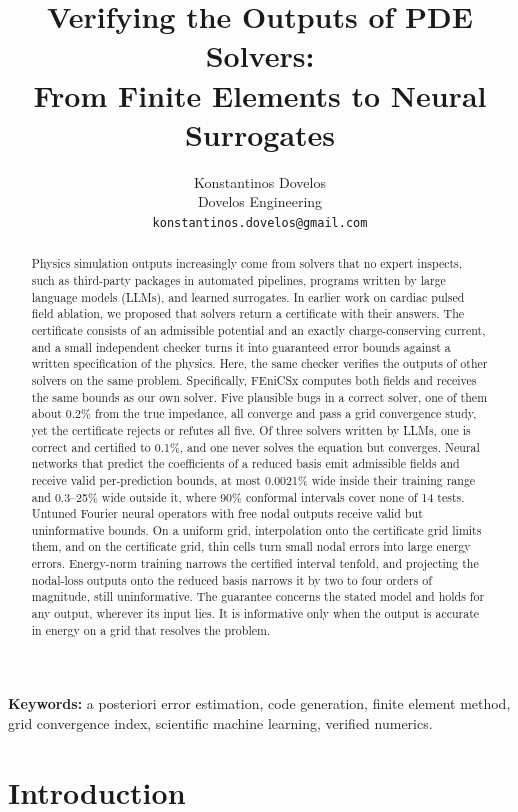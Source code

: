 \documentclass[11pt]{article}
\title{Verifying the Outputs of PDE Solvers:\\
From Finite Elements to Neural Surrogates}
\author{Konstantinos Dovelos\\ \small Dovelos Engineering \\ \small \texttt{konstantinos.dovelos@gmail.com}}
\date{}
\begin{document}
\maketitle

\begin{abstract}
Physics simulation outputs increasingly come from solvers that no expert inspects,
such as third-party packages in automated pipelines, programs written by large
language models (LLMs), and learned surrogates. In earlier work on cardiac pulsed field ablation,
we proposed that solvers return a certificate with their answers. The certificate
consists of an admissible potential and an exactly charge-conserving current, and a small
independent checker turns it into guaranteed error bounds against a written
specification of the physics. Here, the same checker verifies the outputs of other
solvers on the same problem. Specifically, FEniCSx
computes both fields and receives the same bounds as our own solver. Five plausible
bugs in a correct solver, one of them about 0.2\% from the true impedance, all
converge and pass a grid convergence study, yet the certificate
rejects or refutes all five. Of three solvers written by LLMs, one is correct and
certified to 0.1\%, and one never solves the equation but converges. Neural
networks that predict the coefficients of a reduced basis emit admissible fields and
receive valid per-prediction bounds, at most 0.0021\% wide inside their training range
and 0.3--25\% wide outside it, where 90\% conformal intervals cover none of 14 tests.
Untuned Fourier neural operators with free nodal outputs receive valid but
uninformative bounds. On a uniform grid, interpolation onto the certificate grid limits
them, and on the certificate grid, thin cells turn small nodal errors into large
energy errors. Energy-norm training narrows the certified interval
tenfold, and projecting the nodal-loss outputs onto the reduced basis narrows it by two to four
orders of magnitude, still uninformative. The guarantee
concerns the stated model and holds for any output, wherever its input lies. It is
informative only when the output is accurate in energy on a grid that resolves the
problem.
\end{abstract}

\noindent\textbf{Keywords:} a posteriori error estimation, code generation,
finite element method, grid convergence index, scientific machine learning,
verified numerics.

\section{Introduction}
\end{document}
